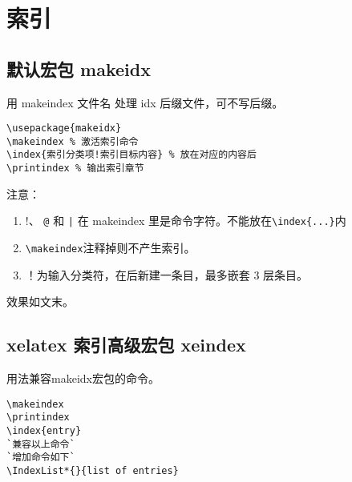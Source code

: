 \section{索引}

\subsection{默认宏包 makeidx}
用\textcolor[rgb]{1.00,0.00,0.00}{ makeindex 文件名 }处理 idx 后缀文件，可不写后缀。
\begin{shaded}
\begin{Verbatim}
\usepackage{makeidx}
\makeindex % 激活索引命令
\index{索引分类项!索引目标内容} % 放在对应的内容后
\printindex % 输出索引章节
\end{Verbatim}
\end{shaded}
注意：\\
\begin{enumerate}
  \item !、 \verb|@| 和 \verb$|$ 在 makeindex 里是命令字符。不能放在\verb|\index{...}|内
  \item \verb|\makeindex|注释掉则不产生索引。
  \item ！为输入分类符，在后新建一条目，最多嵌套 3 层条目。
\end{enumerate}
效果如文末。


\subsection{xelatex 索引高级宏包 xeindex}

用法兼容makeidx宏包的命令。
\begin{lstlisting}[language={[LaTeX]TeX}]
\makeindex
\printindex
\index{entry}
`兼容以上命令`
`增加命令如下`
\IndexList*{}{list of entries}
\end{lstlisting}